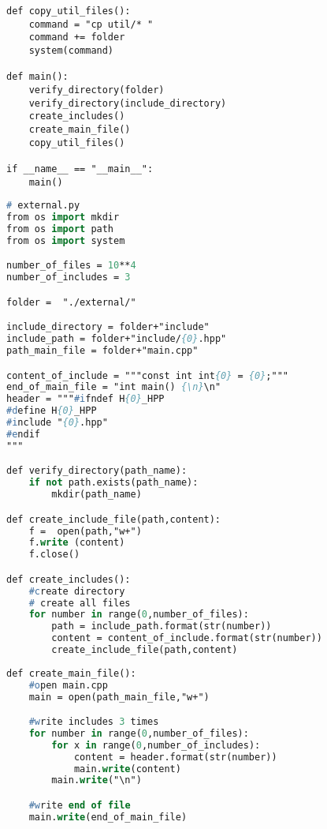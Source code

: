 \begin{apendicesenv}
\begin{lstlisting}
def copy_util_files():                                                           
    command = "cp util/* "                                                       
    command += folder                                                            
    system(command)      

def main():
    verify_directory(folder)
    verify_directory(include_directory)
    create_includes()
    create_main_file()
    copy_util_files()

if __name__ == "__main__":
    main()
\end{lstlisting}

\begin{lstlisting}[language=Pascal,frame=single,captionpos=b,
                                                caption={
                     Script usando para gerar diretorios com Guardas de Inclusão Externa},
                                                            label=script_external_include]
# external.py
from os import mkdir
from os import path
from os import system

number_of_files = 10**4
number_of_includes = 3

folder =  "./external/"

include_directory = folder+"include"
include_path = folder+"include/{0}.hpp"
path_main_file = folder+"main.cpp"

content_of_include = """const int int{0} = {0};"""
end_of_main_file = "int main() {\n}\n"
header = """#ifndef H{0}_HPP
#define H{0}_HPP
#include "{0}.hpp"
#endif
"""

def verify_directory(path_name):
    if not path.exists(path_name):
        mkdir(path_name)

def create_include_file(path,content):
    f =  open(path,"w+")
    f.write (content)
    f.close()

def create_includes():
    #create directory
    # create all files
    for number in range(0,number_of_files):
        path = include_path.format(str(number))
        content = content_of_include.format(str(number))
        create_include_file(path,content)
    
def create_main_file():
    #open main.cpp
    main = open(path_main_file,"w+")

    #write includes 3 times
    for number in range(0,number_of_files):
        for x in range(0,number_of_includes):
            content = header.format(str(number))
            main.write(content)
        main.write("\n")

    #write end of file
    main.write(end_of_main_file)


\end{lstlisting}
\end{apendicesenv}

